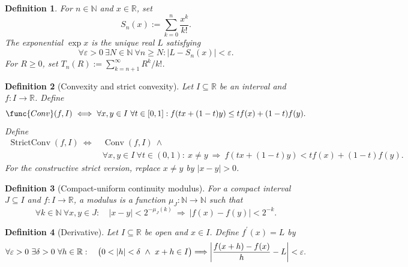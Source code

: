 \documentclass[11pt,reqno]{amsart}
\theoremstyle{redplain}
\newtheorem{definition}{Definition}[section]
\numberwithin{equation}{section}
\begin{document}
\begin{definition}
For $n\in \mathbb{N}$ and $x\in \mathbb{R}$, set 
\begin{equation}
S_{n}(x):=\sum_{k=0}^{n}\frac{x^{k}}{k!}.
\end{equation}%
The exponential $\exp x$ is the unique real $L$ satisfying 
\begin{equation}
\forall \varepsilon >0\ \exists N\in \mathbb{N}\ \forall n\geq
N:|L-S_{n}(x)|<\varepsilon .
\end{equation}%
For $R\geq 0$, set $T_{n}(R):=\sum_{k=n+1}^{\infty }R^{k}/k!$.
\end{definition}

\begin{definition}[Convexity and strict convexity]
Let $I\subseteq \mathbb{R}$ be an interval and $f:I\rightarrow \mathbb{R}$.
Define 
\begin{equation}
\func{Conv}(f,I)\ \Longleftrightarrow \ \forall x,y\in I\ \forall t\in
\lbrack 0,1]:f(tx+(1-t)y)\leq tf(x)+(1-t)f(y).
\end{equation}%
Define 
\begin{equation*}
\begin{aligned} \operatorname{StrictConv}(f,I)\ \Longleftrightarrow\
&\operatorname{Conv}(f,I)\ \wedge\\ &\forall x,y\in I\ \forall t\in(0,1):\
x\ne y\ \Longrightarrow\ f(tx+(1-t)y)<tf(x)+(1-t)f(y). \end{aligned}
\end{equation*}%
For the constructive strict version, replace $x\neq y$ by $|x-y|>0$.
\end{definition}

\begin{definition}[Compact-uniform continuity modulus]
For a compact interval $J\subseteq I$ and $f:I\rightarrow \mathbb{R}$, a
modulus is a function $\mu _{J}:\mathbb{N}\rightarrow \mathbb{N}$ such that 
\begin{equation}
\forall k\in \mathbb{N}\ \forall x,y\in J:\quad |x-y|<2^{-\mu _{J}(k)}\
\Longrightarrow \ |f(x)-f(y)|<2^{-k}.
\end{equation}
\end{definition}

\begin{definition}[Derivative]
Let $I\subseteq \mathbb{R}$ be open and $x\in I$. Define $f^{\prime }(x)=L$
by 
\begin{equation}
\forall \varepsilon >0\ \exists \delta >0\ \forall h\in \mathbb{R}:\quad %
\bigl(0<|h|<\delta \ \wedge \ x+h\in I\bigr)\Longrightarrow \left\vert \frac{%
f(x+h)-f(x)}{h}-L\right\vert <\varepsilon .
\end{equation}
\end{definition}
\end{document}
